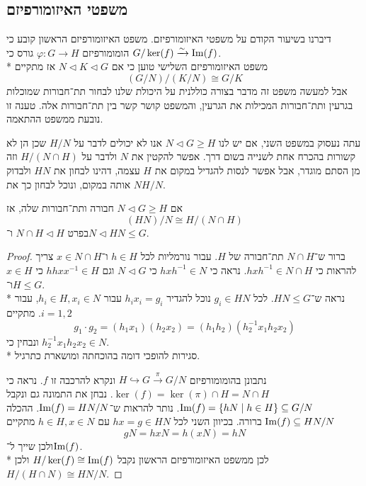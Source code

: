 \subsection{משפטי האיזומורפיזם}
\begin{remark}[תזכורת]
	דיברנו בשיעור הקודם על משפטי האיזומורפיזם.
	משפט האיזומורפיזם הראשון קובע כי הומומורפיזם $\varphi : G \to H$ גורס כי $G / \ker(f) \xrightarrow{\sim} \operatorname{Im}(f)$. \\*
	משפט האיזומורפיזם השלישי טוען כי אם $N \triangleleft K \triangleleft G$ אז מתקיים
	\[
		(G/N) / (K/N) \cong G/K
	\]
	אבל למעשה משפט זה מדבר בצורה כוללנית על היכולת שלנו לבחור תת־חבורות שמוכלות בגרעין ותת־חבורות המכילות את הגרעין, והמשפט קושר קשר בין תת־חבורות אלה.
	טענה זו נובעת ממשפט ההתאמה.
\end{remark}
עתה נעסוק במשפט השני, אם יש לנו $N \triangleleft G \ge H$ אנו לא יכולים לדבר על $H / N$ שכן הן לא קשורות בהכרח אחת לשנייה בשום דרך.
אפשר להקטין את $N$ ולדבר על $H/(N \cap H)$ וזה מן הסתם מוגדר, אבל אפשר לנסות להגדיל במקום את $H$ עצמה, דהינו לבחון את $HN$ ולבדוק אותה במקום, ונוכל לבחון כך את $NH / N$.
\begin{theorem}
	אם $N \triangleleft G \ge H$ חבורה ותת־חבורות שלה, אז
	\[
		(HN)/N \cong H/(N \cap H)
	\]
	בפרט $N \cap H \triangleleft H$ ו־$N \triangleleft HN \le G$.
\end{theorem}
\begin{proof}
	ברור ש־$N \cap H$ תת־חבורה של $H$. עבור נורמליות לכל $h \in H$ ו־$x \in N \cap H$ צריך להראות כי $h x h^{-1} \in N \cap H$.
	נראה כי $h x h^{-1} \in N$ כי $N \triangleleft G$ וגם $h h x x^{-1} \in H$ כי $x \in H$ ו־$H \le G$. \\*
	נראה ש־$HN \le G$. לכל $g_i \in HN$ נוכל להגדיר $h_i x_i = g_i$ עבור $h_i \in H, x_i \in N$, עבור $i = 1, 2$. מתקיים
	\[
		g_1 \cdot g_2 = (h_1 x_1)(h_2 x_2) = (h_1 h_2) (h_2^{-1} x_1 h_2 x_2)
	\]
	ונבחין כי $h_2^{-1} x_1 h_2 x_2 \in N$. \\*
	סגירות להופכי דומה בהוכחתה ומושארת כתרגיל.

	נתבונן בהומומורפיזם $H \hookrightarrow G \xrightarrow{\pi} G/N$ ונקרא להרכבה זו $f$.
	נראה כי $\ker(f) = \ker(\pi) \cap H = N \cap H$.
	נבחן את התמונה גם ונקבל $\operatorname{Im}(f) = \{ hN \mid h \in H \} \subseteq G/N$.
	נותר להראות ש־$\operatorname{Im}(f) = HN/N$. ההכלה $\operatorname{Im}(f) \subseteq HN / N$ ברורה.
	בכיוון השני לכל $hx = g \in HN$ עם $h \in H, x \in N$ מתקיים
	\[
		gN = hxN = h(xN) = hN
	\]
	ולכן שייך ל־$\operatorname{Im}(f)$. \\*
	לכן ממשפט האיזומורפיזם הראשון נקבל $H/\ker(f) \cong \operatorname{Im}(f)$ ולכן $H/(H \cap N) \cong HN/N$.
\end{proof}
